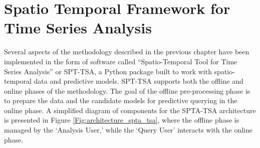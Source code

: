 \chapter{Spatio Temporal Framework for Time Series Analysis}       
\label{Sec:SPTA-TSA}


Several aspects of the methodology described in the previous chapter have been implemented in the form of software called ``Spatio-Temporal Tool for Time Series Analysis'' or SPT-TSA, a Python package built to work with spatio-temporal data and predictive models. SPT-TSA supports both the offline and online phases of the methodology. The goal of the offline pre-processing phase is to prepare the data and the candidate models for predictive querying in the online phase. A simplified diagram of components for the SPTA-TSA architecture is presented in Figure \ref{Fig:architecture_spta_tsa}, where the offline phase is managed by the `Analysis User,' while the `Query User' interacts with the online phase.

